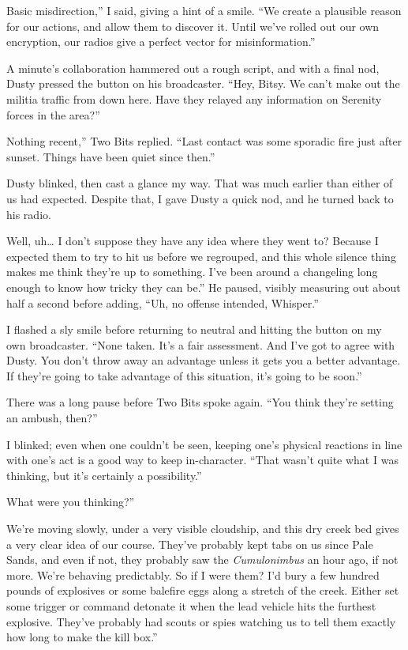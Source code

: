 \leavevmode{}Basic misdirection,” I said, giving a hint of a smile. “We create a plausible reason for our actions, and allow them to discover it. Until we’ve rolled out our own encryption, our radios give a perfect vector for misinformation.”

A minute’s collaboration hammered out a rough script, and with a final nod, Dusty pressed the button on his broadcaster. “Hey, Bitsy. We can’t make out the militia traffic from down here. Have they relayed any information on Serenity forces in the area?”

\leavevmode{}Nothing recent,” Two Bits replied. “Last contact was some sporadic fire just after sunset. Things have been quiet since then.”

Dusty blinked, then cast a glance my way. That was much earlier than either of us had expected. Despite that, I gave Dusty a quick nod, and he turned back to his radio.

\leavevmode{}Well, uh… I don’t suppose they have any idea where they went to? Because I expected them to try to hit us before we regrouped, and this whole silence thing makes me think they’re up to something. I’ve been around a changeling long enough to know how tricky they can be.” He paused, visibly measuring out about half a second before adding, “Uh, no offense intended, Whisper.”

I flashed a sly smile before returning to neutral and hitting the button on my own broadcaster. “None taken. It’s a fair assessment. And I’ve got to agree with Dusty. You don’t throw away an advantage unless it gets you a better advantage. If they’re going to take advantage of this situation, it’s going to be soon.”

There was a long pause before Two Bits spoke again. “You think they’re setting an ambush, then?”

I blinked; even when one couldn’t be seen, keeping one’s physical reactions in line with one’s act is a good way to keep in-character. “That wasn’t quite what I was thinking, but it’s certainly a possibility.”

\leavevmode{}What were you thinking?”

\leavevmode{}We’re moving slowly, under a very visible cloudship, and this dry creek bed gives a very clear idea of our course. They’ve probably kept tabs on us since Pale Sands, and even if not, they probably saw the \textit{Cumulonimbus} an hour ago, if not more. We’re behaving predictably. So if I were them? I’d bury a few hundred pounds of explosives or some balefire eggs along a stretch of the creek. Either set some trigger or command detonate it when the lead vehicle hits the furthest explosive. They’ve probably had scouts or spies watching us to tell them exactly how long to make the kill box.”

